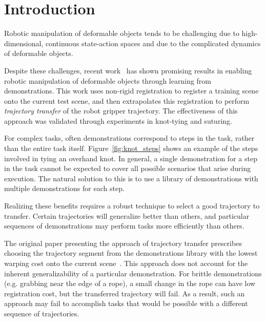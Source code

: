 \section{Introduction}

Robotic manipulation of deformable objects tends to be challenging due to high-dimensional, 
continuous state-action spaces and due to the complicated dynamics of
deformable objects.

Despite these challenges, recent
work~\cite{Schulmanetal_IROS2013, Schulmanetal_ISRR2013} has shown
promising results in enabling robotic manipulation of deformable
objects through learning from demonstrations. This work
uses non-rigid registration to register a training scene onto the
current test scene, and then extrapolates this registration to perform
\emph{trajectory transfer} of the robot gripper trajectory.  The
effectiveness of this approach was validated through experiments in
knot-tying and suturing.

For complex tasks, often demonstrations correspond to steps in the task, rather
than the entire task itself. Figure~\ref{fig:knot_steps} shows an example
of the steps involved in tying an overhand knot.
In general, a single demonstration for a step in the task cannot be expected
to cover all possible scenarios that arise during execution.
The natural solution to this is to use a library of demonstrations with
multiple demonstrations for each step.

Realizing these benefits requires a robust technique to select a good trajectory to
transfer.  Certain trajectories will generalize better than others, and particular sequences of 
demonstrations may perform tasks more efficiently than others.

The original paper presenting the approach of trajectory transfer
prescribes choosing the trajectory segment from the demonstrations
library with the lowest warping cost onto the current scene~\cite{Schulmanetal_ISRR2013}.
This approach does not account for the inherent generalizability
of a particular demonstration. For brittle demonstrations (e.g. grabbing
near the edge of a rope), a small change in the rope can have low registration
cost, but the transferred trajectory will fail.
As a result, such an approach may fail to accomplish tasks
that would be possible with a different sequence of trajectories.

